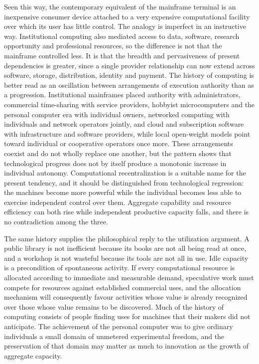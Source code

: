 \documentclass[11pt]{article}
\theoremstyle{plain}
\theoremstyle{definition}
\begin{document}
Seen this way, the contemporary equivalent of the mainframe terminal is an inexpensive consumer device attached to a very expensive computational facility over which its user has little control. The analogy is imperfect in an instructive way. Institutional computing also mediated access to data, software, research opportunity and professional resources, so the difference is not that the mainframe controlled less. It is that the breadth and pervasiveness of present dependencies is greater, since a single provider relationship can now extend across software, storage, distribution, identity and payment. The history of computing is better read as an oscillation between arrangements of execution authority than as a progression. Institutional mainframes placed authority with administrators, commercial time-sharing with service providers, hobbyist microcomputers and the personal computer era with individual owners, networked computing with individuals and network operators jointly, and cloud and subscription software with infrastructure and software providers, while local open-weight models point toward individual or cooperative operators once more. These arrangements coexist and do not wholly replace one another, but the pattern shows that technological progress does not by itself produce a monotonic increase in individual autonomy. Computational recentralization is a suitable name for the present tendency, and it should be distinguished from technological regression: the machines become more powerful while the individual becomes less able to exercise independent control over them. Aggregate capability and resource efficiency can both rise while independent productive capacity falls, and there is no contradiction among the three.

The same history supplies the philosophical reply to the utilization argument. A public library is not inefficient because its books are not all being read at once, and a workshop is not wasteful because its tools are not all in use. Idle capacity is a precondition of spontaneous activity. If every computational resource is allocated according to immediate and measurable demand, speculative work must compete for resources against established commercial uses, and the allocation mechanism will consequently favour activities whose value is already recognized over those whose value remains to be discovered. Much of the history of computing consists of people finding uses for machines that their makers did not anticipate. The achievement of the personal computer was to give ordinary individuals a small domain of unmetered experimental freedom, and the preservation of that domain may matter as much to innovation as the growth of aggregate capacity.
\end{document}
